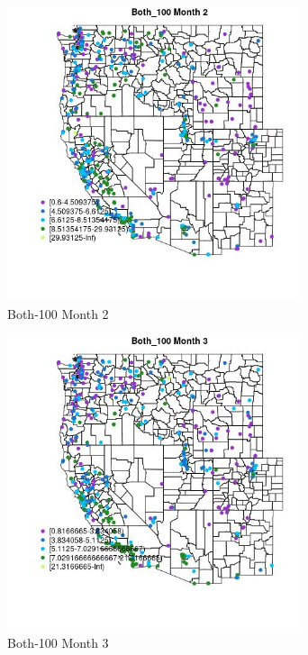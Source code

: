\begin{figure} 
\centering  
\includegraphics[width=0.77\textwidth]{Code_Outputs/ML_input_report_ML_input_PM25_Step5_part_d_de_duplicated_aves_ML_input_MapObsMo2Both_100.jpg} 
\caption{\label{fig:ML_input_report_ML_input_PM25_Step5_part_d_de_duplicated_aves_ML_inputMapObsMo2Both_100}Both-100 Month 2} 
\end{figure} 
 

\begin{figure} 
\centering  
\includegraphics[width=0.77\textwidth]{Code_Outputs/ML_input_report_ML_input_PM25_Step5_part_d_de_duplicated_aves_ML_input_MapObsMo3Both_100.jpg} 
\caption{\label{fig:ML_input_report_ML_input_PM25_Step5_part_d_de_duplicated_aves_ML_inputMapObsMo3Both_100}Both-100 Month 3} 
\end{figure} 
 

